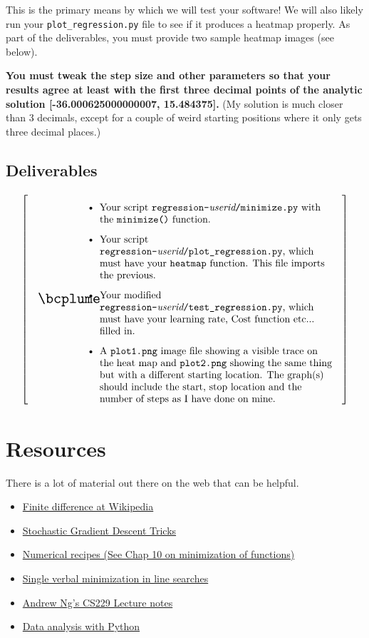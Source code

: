 \documentclass[titlepage]{tufte-book}
\makeatletter
\newenvironment{callout}[1]{
\[
  \left[
      \begin{tabular}{@{\quad}m{.05\textwidth}@{\qquad}m{.75\textwidth}@{\quad}}
        \scalebox{1.5}{#1} & 
          \raggedright%
}
{
      \end{tabular}
    \right]
\]
}
\makeatother
\begin{document}
\begin{fullwidth}
This is the primary means by which we will test your software!  We will also likely run your {\tt plot\_regression.py} file to see if it produces a heatmap properly. As part of the deliverables, you must provide two sample heatmap images (see below).

{\bf You must tweak the step size and other parameters so that your results agree at least with the first {\bf three} decimal points of the analytic solution [-36.000625000000007, 15.484375].} (My solution is much closer than 3 decimals, except for a couple of weird starting positions where it only gets three decimal places.)

\subsection{Deliverables}

\begin{callout}{\bcplume}
\begin{itemize}
\item Your script {\tt regression-}{\em userid}{\tt /minimize.py} with the {\tt minimize()} function.
\item Your script {\tt regression-}{\em userid}{\tt /plot\_regression.py}, which must have your {\tt heatmap} function.  This file imports the previous.
\item Your modified {\tt regression-}{\em userid}{\tt /test\_regression.py}, which must have your learning rate, Cost function etc... filled in.
\item A {\tt plot1.png} image file showing a visible trace on the heat map and {\tt plot2.png} showing the same thing but with a different starting location. The graph(s) should include the start, stop location and the number of steps as I have done on mine.\end{itemize}
\end{callout}


\section{Resources}

There is a lot of material out there on the web that can be helpful.

\begin{itemize}
\item \href{http://en.wikipedia.org/wiki/Finite_difference}{Finite difference at Wikipedia}
\item \href{http://research.microsoft.com/pubs/192769/tricks-2012.pdf}{Stochastic Gradient Descent Tricks}
\item \href{http://apps.nrbook.com/fortran/index.html}{Numerical recipes (See Chap 10 on minimization of functions)}
\item \href{http://adl.stanford.edu/aa222/Lecture_Notes_files/AA222-Lecture2.pdf}{Single verbal minimization in line searches}
\item \href{http://cs229.stanford.edu/notes/cs229-notes1.pdf}{Andrew Ng's CS229 Lecture notes}
\item \href{http://people.duke.edu/~ccc14/pcfb/analysis.html}{Data analysis with Python}
\end{itemize}

\end{fullwidth}
\end{document}
